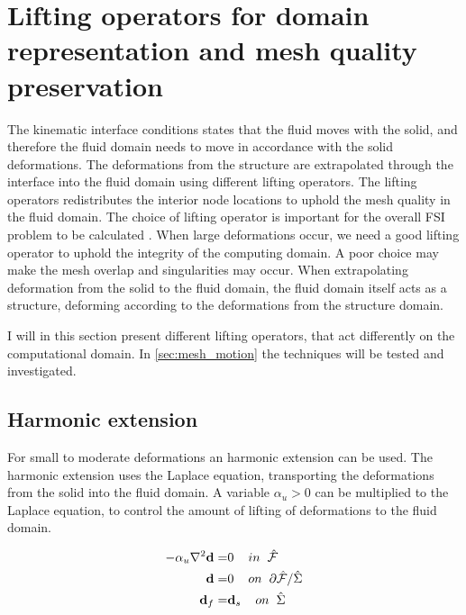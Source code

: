\section{Lifting operators for domain representation and mesh quality preservation} \label{sec:meshmotion}
The kinematic interface conditions states that the fluid moves with the solid, and therefore the fluid domain needs to move in accordance with the solid deformations. The deformations from the structure are extrapolated through the interface into the fluid domain using different lifting operators. The lifting operators redistributes the interior node locations to uphold the mesh quality in the fluid domain.
The choice of lifting operator is important for the overall FSI problem to be calculated \cite{Wick2011a}. When large deformations occur, we need a good lifting operator to uphold the integrity of the computing domain. A poor choice may make the mesh overlap and singularities may occur. 
When extrapolating deformation from the solid to the fluid domain, the fluid domain itself acts as a structure, deforming according to the deformations from the structure domain.\newline

I will in this section present different lifting operators, that act differently on the computational domain. In \ref{sec:mesh_motion} the techniques will be tested and investigated.

\subsection{Harmonic extension}
For small to moderate deformations an harmonic extension can be used. The harmonic extension uses the Laplace equation, transporting the deformations from the solid into the fluid domain. A variable $\alpha_u > 0$ can be multiplied to the Laplace equation, to control the amount of lifting of deformations to the fluid domain.

\begin{align}
 - \alpha_u \nabla^2 \bold{d} =& 0\hspace{4mm} in \hspace{2mm} \hat{\mathcal{F}}\\
  \hspace{4mm} \bold{d} =& 0 \hspace{4mm } on \hspace{2mm }  \partial \hat{\mathcal{F}} / \hat{\Sigma} \\
  \bold{d}_f =& \bold{d}_s \hspace{4mm } on \hspace{2mm } \hat{\Sigma} 
\end{align}

